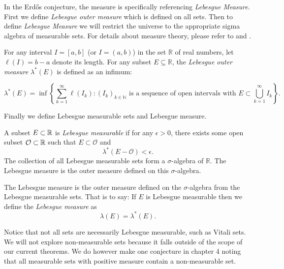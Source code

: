 In the Erd\H{o}s conjecture, the measure is specifically referencing \textit{Lebesgue Measure}.  First we define \textit{Lebesgue outer measure} which is defined on all sets. Then to define \textit{Lebesgue Measure} we will restrict the universe to the appropriate sigma algebra of measurable sets. For details about measure theory, please refer to \cite{Axler} and \cite{Stein&Shak}.

\begin{definition}
    For any interval $I = [a,b]$ (or $I = (a, b)$) in the set $\mathbb{R}$ of real numbers, let $\ell(I)= b - a$ denote its length. For any subset $E\subseteq\mathbb{R}$, the \textit{Lebesgue outer measure} $\lambda^*(E)$ is defined as an infimum: 
    
    $$\lambda^*(E) = \inf \left\{\sum_{k=1}^\infty \ell(I_k) : {(I_k)_{k \in \mathbb N}} \text{ is a sequence of open intervals with } E\subset \bigcup_{k=1}^\infty I_k\right\}.$$
\end{definition}

Finally we define Lebesgue measurable sets and Lebesgue measure. 
\begin{definition}
    A subset $E\subset \mathbb{R}$ is \textit{Lebesgue measurable} if for any $\epsilon > 0$, there exists some open subset $\mathcal{O}\subset \mathbb{R}$ such that 
    $E\subset \mathcal{O}$ and 
    $$\lambda^*(E - \mathcal{O}) < \epsilon. $$
    The collection of all Lebesgue measurable sets form a $\sigma$-algebra of ${\mathbb R}$. The Lebesgue measure is the outer measure defined on this $\sigma$-algebra.  
\end{definition}
\begin{definition}
    The Lebesgue measure is the outer measure defined on the $\sigma$-algebra from the Lebesgue measurable sets. That is to say:
    If $E$ is Lebesgue measurable then we define the \textit{Lebesgue measure} as 
    $$\lambda(E) = \lambda^*(E).$$
\end{definition}

Notice that not all sets are necessarily Lebesgue measurable, such as Vitali sets.  We will not explore non-measurable sets because it falls outside of the scope of our current theorems.  We do however make one conjecture in chapter 4 noting that all measurable sets with positive measure contain a non-measurable set.  



